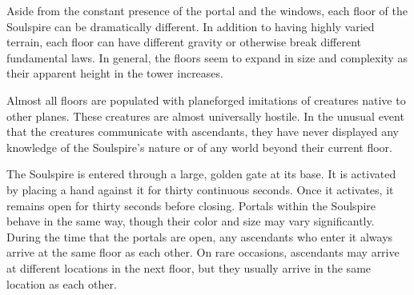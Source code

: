         Aside from the constant presence of the portal and the windows, each floor of the Soulspire can be dramatically different.
        In addition to having highly varied terrain, each floor can have different gravity or otherwise break different fundamental laws.
        In general, the floors seem to expand in size and complexity as their apparent height in the tower increases.

        Almost all floors are populated with planeforged imitations of creatures native to other planes.
        These creatures are almost universally hostile.
        In the unusual event that the creatures communicate with ascendants, they have never displayed any knowledge of the Soulspire's nature or of any world beyond their current floor.

        The Soulspire is entered through a large, golden gate at its base.
        It is activated by placing a hand against it for thirty continuous seconds.
        Once it activates, it remains open for thirty seconds before closing.
        Portals within the Soulspire behave in the same way, though their color and size may vary significantly.
        During the time that the portals are open, any ascendants who enter it always arrive at the same floor as each other.
        On rare occasions, ascendants may arrive at different locations in the next floor, but they usually arrive in the same location as each other.
